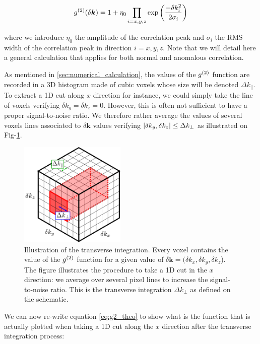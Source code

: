 \begin{equation}
    g^{(2)} (\delta \bm{k}) = 1 + \eta_0 \prod_{i=x,y,z} \exp \left(\frac{-\delta k_i^2}{2 \sigma_i}\right)
    \label{eq:g2_theo}
\end{equation}

\noindent where we introduce $\eta_0$ the amplitude of the correlation peak and $\sigma_i$ the RMS width of the correlation peak in direction $i=x,y,z$. Note that we will detail here a general calculation that applies for both normal and anomalous correlation.

As mentioned in \ref{sec:numerical_calculation}, the values of the $g^{(2)}$ function are recorded in a 3D histogram made of cubic voxels whose size will be denoted $\Delta k_{\parallel}$. To extract a 1D cut along $x$ direction for instance, we could simply take the line of voxels verifying $\delta k_y=\delta k_z =0$. However, this is often not sufficient to have a proper signal-to-noise ratio. We therefore rather average the values of several voxels lines associated to $\delta \bm{k}$ values verifying $\left\lvert\delta k_y, \delta k_z\right\rvert \leq \Delta k_{\perp}$ as illustrated on Fig-\ref{fig:cube_integration}.

\begin{figure}
    \centering
    \includegraphics[width=0.45\textwidth]{Fig/Chapter4/cube_integration.png}
    \caption{Illustration of the transverse integration. Every voxel contains the value of the $g^{(2)}$ function for a given value of $\delta \bm{k}=(\delta k_x, \delta k_y, \delta k_z$). The figure illustrates the procedure to take a 1D cut in the $x$ direction: we average over several pixel lines to increase the signal-to-noise ratio. This is the transverse integration $\Delta k_{\perp}$ as defined on the schematic.}
    \label{fig:cube_integration}
\end{figure}

We can now re-write equation \ref{eq:g2_theo} to show what is the function that is actually plotted when taking a 1D cut along the $x$ direction after the transverse integration process:

